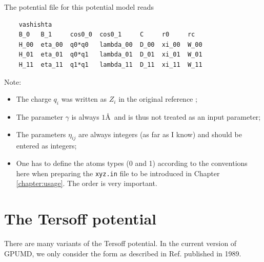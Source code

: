 \documentclass[12pt,a4paper]{report}
\begin{document}
The potential file for this potential model reads
\begin{verbatim}
    vashishta 
    B_0   B_1     cos0_0  cos0_1     C     r0     rc
    H_00  eta_00  q0*q0   lambda_00  D_00  xi_00  W_00
    H_01  eta_01  q0*q1   lambda_01  D_01  xi_01  W_01
    H_11  eta_11  q1*q1   lambda_11  D_11  xi_11  W_11
\end{verbatim}
Note:
\begin{itemize}
\item The charge $q_i$ was written as $Z_i$ in the original reference \cite{vashishta2007jap};
\item The parameter $\gamma$ is always $1$\AA~and is thus not treated as an input parameter;
\item The parameters $\eta_{ij}$ are always integers (as far as I know) and should be entered as integers;
\item One has to define the atoms types (0 and 1) according to the conventions here when preparing the \verb"xyz.in" file to be introduced in Chapter \ref{chapter:usage}. The order is very important.
\end{itemize}


\section{The Tersoff potential}

There are many variants of the Tersoff potential. In the current version of GPUMD, we only consider the form as described in Ref. \cite{tersoff1989prb} published in 1989.
\end{document}
